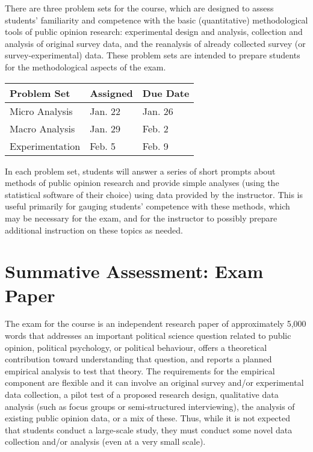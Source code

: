 \documentclass[12pt,a4paper]{article}
\begin{document}
{There are three problem sets for the course, which are designed to assess students' familiarity and competence with the basic (quantitative) methodological tools of public opinion research: experimental design and analysis, collection and analysis of original survey data, and the reanalysis of already collected survey (or survey-experimental) data. These problem sets are intended to prepare students for the methodological aspects of the exam.

\begin{center}
\begin{tabular}{lll} \hline
\textbf{Problem Set} & \textbf{Assigned} & \textbf{Due Date} \\ \hline
Micro Analysis & Jan. 22 & Jan. 26 \\
Macro Analysis & Jan. 29 & Feb. 2 \\
Experimentation & Feb. 5 & Feb. 9 \\ \hline
\end{tabular}
\end{center}

In each problem set, students will answer a series of short prompts about methods of public opinion research and provide simple analyses (using the statistical software of their choice) using data provided by the instructor. This is useful primarily for gauging students' competence with these methods, which may be necessary for the exam, and for the instructor to possibly prepare additional instruction on these topics as needed.


\section{Summative Assessment: Exam Paper}

The exam for the course is an independent research paper of approximately 5,000 words that addresses an important political science question related to public opinion, political psychology, or political behaviour, offers a theoretical contribution toward understanding that question, and reports a planned empirical analysis to test that theory. The requirements for the empirical component are flexible and it can involve an original survey and/or experimental data collection, a pilot test of a proposed research design, qualitative data analysis (such as focus groups or semi-structured interviewing), the analysis of existing public opinion data, or a mix of these. Thus, while it is not expected that students conduct a large-scale study, they must conduct some novel data collection and/or analysis (even at a very small scale).

}
\end{document}
